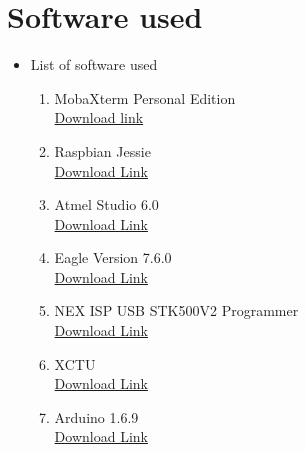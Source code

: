 \documentclass[a4paper,12pt,oneside]{book}
\begin{document}
\section{Software used}
\begin{itemize}
  \item List of software used 
  \begin{enumerate}
      \item MobaXterm Personal Edition \\
      \href{http://mobaxterm.mobatek.net/MobaXterm_Setup_9.1.msi} {Download link}
      \item Raspbian Jessie   \\
      \href{https://downloads.raspberrypi.org/raspbian_latest}{Download Link}
      \item Atmel Studio 6.0 \\
      \href{http://atmel-studio.software.informer.com/download/?ca56297}{Download Link}
      \item Eagle Version 7.6.0 \\
      \href{http://www.cadsoftusa.com/download-eagle/}{Download Link}
      \item NEX ISP USB STK500V2 Programmer \\
      \href{http://www.nex-robotics.com/images/downloads/NEX\%20AVR\%20STK500V2.zip}{Download Link}
      \item XCTU \\
      \href{http://www.digi.com/products/xbee-rf-solutions/xctu-software/xctu#productsupport-utilities}{Download Link}
      \item Arduino 1.6.9  \\
       \href{https://www.arduino.cc/en/Main/Software}{Download Link}
      
      
  \end{enumerate}
\end{itemize}
\end{document}
